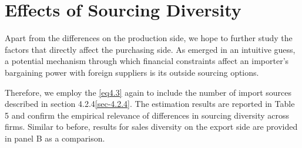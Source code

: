 \section{Effects of Sourcing Diversity}

Apart from the differences on the production side, we hope to further study the factors that directly affect the purchasing side. As emerged in an intuitive guess, a potential mechanism through which financial constraints affect an importer's bargaining power with foreign suppliers is its outside sourcing options. 

Therefore, we employ the \ref{eq4.3} again to include the number of import sources described in section 4.2.4\ref{sec-4.2.4}. The estimation results are reported in Table 5 and confirm the empirical relevance of differences in sourcing diversity across firms. Similar to before, results for sales diversity on the export side are provided in panel B as a comparison.


